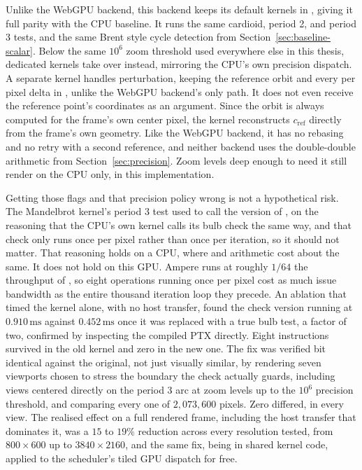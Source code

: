 \documentclass{ftndiplomski}
\begin{document}
Unlike the WebGPU backend, this backend keeps its default kernels in , giving it full parity with the
CPU baseline. It runs the same cardioid, period 2, and period 3 tests, and the same Brent style cycle
detection from Section~\ref{sec:baseline-scalar}. Below the same $10^6$ zoom threshold used
everywhere else in this thesis, dedicated  kernels take over instead, mirroring the CPU's
own precision dispatch. A separate kernel handles
perturbation, keeping the reference orbit and every per pixel delta in , unlike the
WebGPU backend's  only path. It does not even receive the reference point's coordinates as
an argument. Since the orbit is always computed for the frame's own center pixel, the kernel
reconstructs $c_{\mathrm{ref}}$ directly from the frame's own geometry. Like the WebGPU backend, it
has no rebasing and no
retry with a second reference, and neither backend uses the double-double arithmetic from
Section~\ref{sec:precision}. Zoom levels deep enough to need it still render on the CPU only, in
this implementation.

Getting those flags and that precision policy wrong is not a hypothetical risk. The 
Mandelbrot kernel's period 3 test used to call the  version of ,
on the reasoning that the CPU's
own  kernel calls its  bulb check the same way, and that check only runs once per
pixel rather than once per iteration, so it should not matter. That reasoning holds on a CPU, where
 and  arithmetic cost about the same. It does not hold on this GPU. Ampere runs
 at roughly $1/64$ the throughput of , so eight  operations running once
per pixel cost as much issue bandwidth as the entire thousand iteration  loop they
precede. An ablation that timed the kernel alone, with no host transfer, found the  check
version running at $0.910\,\mathrm{ms}$ against $0.452\,\mathrm{ms}$ once it was replaced with a
true  bulb test, a factor of two, confirmed by inspecting the compiled PTX directly. Eight
 instructions survived in the old kernel and zero in the new one. The fix was verified
bit identical against the original, not just visually similar, by rendering seven viewports chosen
to stress the boundary the check actually guards, including views centered directly on the
period 3 arc at zoom levels up to the $10^6$ precision threshold, and comparing every one of
$2{,}073{,}600$ pixels. Zero differed, in every view. The realised effect on a full rendered frame,
including the host transfer that dominates it, was a $15$ to $19\%$ reduction across every
resolution tested, from $800\times600$ up to $3840\times2160$, and the same fix, being in shared
kernel code, applied to the scheduler's tiled GPU dispatch for free.
\end{document}
